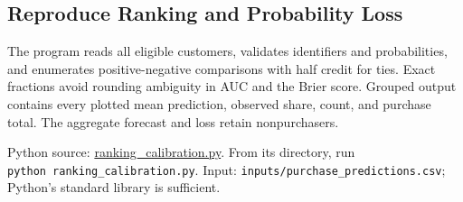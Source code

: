 \FloatBarrier

\hypertarget{M07-reproduce-ranking-and-probability-loss}{%
\subsection{Reproduce Ranking and Probability
Loss}\label{M07-reproduce-ranking-and-probability-loss}}

\noindent \noindent The program reads all eligible customers, validates
identifiers and probabilities, and enumerates positive-negative
comparisons with half credit for ties. Exact fractions avoid rounding
ambiguity in AUC and the Brier score. Grouped output contains every
plotted mean prediction, observed share, count, and purchase total. The
aggregate forecast and loss retain nonpurchasers.

\FloatBarrier
{}
Python source:
\href{../03_Data_and_Code/Statistical_Graphics/ranking_calibration.py}{ranking\_calibration.py}.
From its directory, run \texttt{python\ ranking\_calibration.py}. Input:
\texttt{inputs/purchase\_predictions.csv}; Python's standard library is
sufficient.

